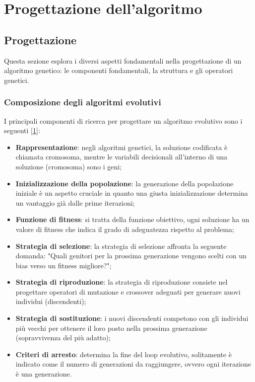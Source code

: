 \chapter{Progettazione dell'algoritmo}
\label{cap:analisi-requisiti}


\section{Progettazione}

Questa sezione esplora i diversi aspetti fondamentali nella progettazione di un algoritmo genetico: le componenti fondamentali, la struttura e gli operatori genetici.

\subsection{Composizione degli algoritmi evolutivi} \hypertarget{elementi}{}

I principali componenti di ricerca per progettare un algoritmo evolutivo sono i seguenti [\hyperlink{bibliografia}{1}]:

\begin{itemize}
    \item \textbf{Rappresentazione}: negli algoritmi genetici, la soluzione codificata è chiamata cromosoma, mentre le variabili decisionali all'interno di una soluzione (cromosoma) sono i geni;
    
    \item \textbf{Inizializzazione della popolazione}: la generazione della popolazione iniziale è un aspetto cruciale in quanto una giusta inizializzazione determina un vantaggio già dalle prime iterazioni;
    
    \item \textbf{Funzione di fitness}: si tratta della funzione obiettivo, ogni soluzione ha un valore di fitness che indica il grado di adeguatezza rispetto al problema;
    
    \item \textbf{Strategia di selezione}: la strategia di selezione affronta la seguente domanda: "Quali genitori per la prossima generazione vengono scelti con un bias verso un fitness migliore?";
    
    \item \textbf{Strategia di riproduzione}: la strategia di riproduzione consiste nel progettare operatori di mutazione e crossover adeguati per generare nuovi individui (discendenti);
    
    \item \textbf{Strategia di sostituzione}: i nuovi discendenti competono con gli individui più vecchi per ottenere il loro posto nella prossima generazione (sopravvivenza del più adatto);
    
    \item \textbf{Criteri di arresto}: determina la fine del loop evolutivo, solitamente è indicato come il numero di generazioni da raggiungere, ovvero ogni iterazione è una generazione.
\end{itemize}

